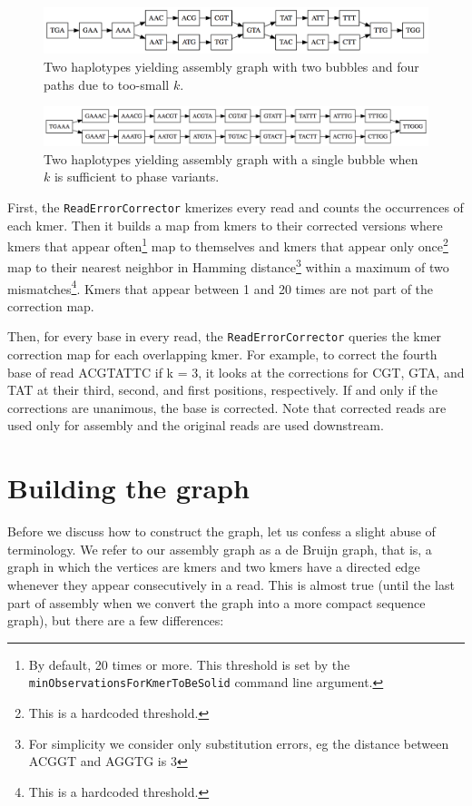 \documentclass[nofootinbib,amssymb,amsmath]{revtex4}
\newcommand{\code}[1]{\texttt{#1}}
\begin{document}
\begin{figure}
\center
\includegraphics[scale=0.5]{unphased_graph.png}
\caption{Two haplotypes yielding assembly graph with two bubbles and four paths due to too-small $k$.}
\label{fig:unphased}
\end{figure}

\begin{figure}
\center
\includegraphics[scale=0.5]{phased_graph.png}
\caption{Two haplotypes yielding assembly graph with a single bubble when $k$ is sufficient to phase variants.}
\label{fig:phased}
\end{figure}

First, the \code{ReadErrorCorrector} kmerizes every read and counts the occurrences of each kmer.  Then it builds a map from kmers to their corrected versions where kmers that appear often\footnote{By default, 20 times or more.  This threshold is set by the \code{minObservationsForKmerToBeSolid} command line argument.} map to themselves and kmers that appear only once\footnote{This is a hardcoded threshold.} map to their nearest neighbor in Hamming distance\footnote{For simplicity we consider only substitution errors, eg the distance between ACGGT and AGGTG is 3} within a maximum of two mismatches\footnote{This is a hardcoded threshold.}.  Kmers that appear between 1 and 20 times are not part of the correction map.

Then, for every base in every read, the \code{ReadErrorCorrector} queries the kmer correction map for each overlapping kmer.  For example, to correct the fourth base of read ACGTATTC if k = 3, it looks at the corrections for CGT, GTA, and TAT at their third, second, and first positions, respectively.  If and only if the corrections are unanimous, the base is corrected.  Note that corrected reads are used only for assembly and the original reads are used downstream.

\section{Building the graph} \label{graph-assembly}
Before we discuss how to construct the graph, let us confess a slight abuse of terminology.  We refer to our assembly graph as a de Bruijn graph, that is, a graph in which the vertices are kmers and two kmers have a directed edge whenever they appear consecutively in a read.  This is almost true (until the last part of assembly when we convert the graph into a more compact sequence graph), but there are a few differences:
\end{document}
